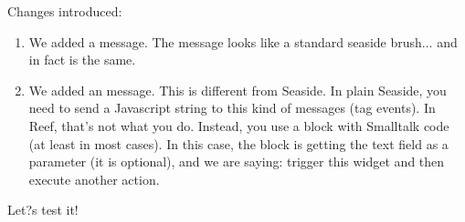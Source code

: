 \documentclass[a4paper,10pt,twoside]{book}
\begin{document}
Changes introduced: 
\begin{enumerate}
\item We added a  message. The  message looks like a standard seaside brush...
and in fact is the same.

\item We added an  message. This is different from Seaside. In plain Seaside,
you need to send a Javascript string to this kind of messages (tag events). 
In Reef, that's not what you do. Instead, you use a block with Smalltalk code (at least in most cases). 
In this case, the  block is getting the text field as a parameter (it is optional), and we are saying: trigger this widget and then execute another action.
\end{enumerate}
Let?s test it!




\ifx\wholebook\relax\else
   
   
\end{document}
